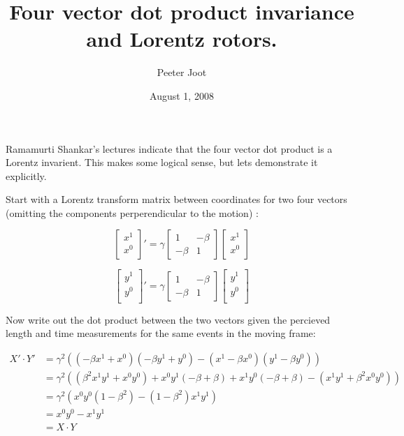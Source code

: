\documentclass{article}      %
\title{Four vector dot product invariance and Lorentz rotors.} %
\author{Peeter Joot}         %
\date{August 1, 2008}        %
\begin{document}

\maketitle{}

\section{}

Ramamurti Shankar's lectures indicate that the four vector dot product
is a Lorentz invarient.  This makes some logical sense, but lets demonstrate it explicitly.

Start with a Lorentz transform matrix between coordinates for two four vectors (omitting the components perperendicular  to the motion) :

\begin{equation*}
{
\begin{bmatrix}
x^1 \\
x^0 \\
\end{bmatrix}
}'
=
\gamma
\begin{bmatrix}
1 & -\beta \\
-\beta & 1
\end{bmatrix}
\begin{bmatrix}
x^1 \\
x^0 \\
\end{bmatrix}
\end{equation*}

\begin{equation*}
{
\begin{bmatrix}
y^1 \\
y^0 \\
\end{bmatrix}
}'
=
\gamma
\begin{bmatrix}
1 & -\beta \\
-\beta & 1
\end{bmatrix}
\begin{bmatrix}
y^1 \\
y^0 \\
\end{bmatrix}
\end{equation*}

Now write out the dot product between the two vectors given the percieved length and time measurements for the same events in the moving frame:

\begin{align*}
X' \cdot Y' 
&= \gamma^2 \left( (-\beta x^1 + x^0)(-\beta y^1 + y^0) -(x^1 -\beta x^0) (y^1 -\beta y^0) \right) \\
&= \gamma^2 \left( (\beta^2 x^1 y^1 + x^0 y^0) + x^0 y^1( -\beta + \beta ) + x^1 y^0( -\beta + \beta ) -(x^1 y^1 + \beta^2 x^0 y^0) \right) \\
&= \gamma^2 \left( x^0 y^0 (1-\beta^2) - (1-\beta^2) x^1 y^1 \right) \\
&= x^0 y^0 - x^1 y^1 \\
&= X \cdot Y
\end{align*}
\end{document}
